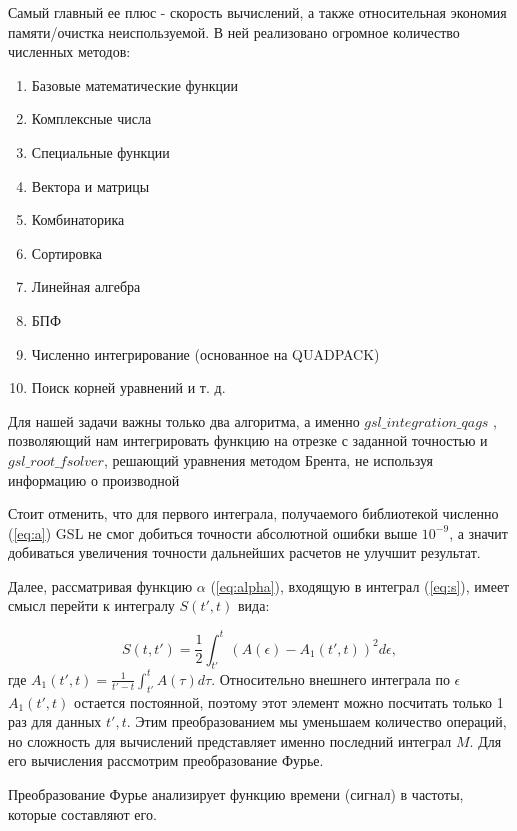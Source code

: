 \documentclass[14pt, a4paper]{article}
\numberwithin{figure}{section}
\numberwithin{equation}{section}
\begin{document}
Самый главный ее плюс - скорость вычислений, а также относительная экономия памяти/очистка неиспользуемой. В ней реализовано огромное количество численных методов:

\begin{enumerate} 
	\item Базовые математические функции
	\item Комплексные числа
	\item Специальные функции
	\item Вектора и матрицы
	\item Комбинаторика
	\item Сортировка
	\item Линейная алгебра
	\item БПФ
	\item Численно интегрирование (основанное на QUADPACK)
	\item Поиск корней уравнений и т. д.
\end{enumerate}

Для нашей задачи важны только два алгоритма, а именно $gsl\_integration\_qags$ \cite{gsl:website2}, позволяющий нам интегрировать функцию на отрезке с заданной точностью и $gsl\_root\_fsolver$, решающий уравнения методом Брента, не используя информацию о производной \cite{gsl:website}

Стоит отменить, что для первого интеграла, получаемого библиотекой численно (\ref{eq:a}) GSL не смог добиться точности абсолютной ошибки выше $10^{-9}$, а значит добиваться увеличения точности дальнейших расчетов не улучшит результат.

Далее, рассматривая функцию $\alpha$ (\ref{eq:alpha}), входящую в интеграл (\ref{eq:s}), имеет смысл перейти к интегралу $S(t', t)$ вида:

\begin{equation}\label{eq:s_integrate2}
S(t, t') = \frac{1}{2}\int_{t'}^{t} \left( A(\epsilon) - A_1(t', t) \right)^2 d\epsilon,
\end{equation}
где $A_1(t', t) = \frac{1}{t'-t}\int_{t'}^{t}A(\tau) d\tau$. Относительно внешнего интеграла по $\epsilon$ $A_1(t', t)$ остается постоянной, поэтому этот элемент можно посчитать только 1 раз для данных $t' ,t$. Этим преобразованием мы уменьшаем количество операций, но сложность для вычислений представляет именно последний интеграл $M$. Для его вычисления рассмотрим преобразование Фурье.

Преобразование Фурье анализирует функцию времени (сигнал) в частоты, которые составляют его.
\end{document}
